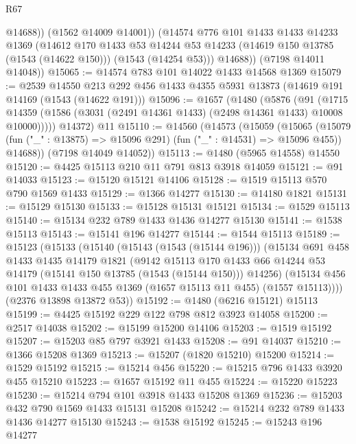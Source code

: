 \begin{lexlean}{R67}
\begin{coremodule}
              @14688))
          (@1562 @14009 @14001))
        (@14574
          @776
          @101
          @1433
          @1433
          @14233
          @1369
          (@14612
            @170
            @1433
            @53
            @14244
            @53
            @14233
            (@14619 @150 @13785 (@1543 (@14622 @150)))
            (@1543 (@14254 @53)))
          @14688))
      (@7198 @14011 @14048))
@15065 := @14574 @783 @101 @14022 @1433 @14568 @1369
@15079 := @2539
    @14550
    @213
    @292
    @456
    @1433
    @4355
    @5931
    @13873
    (@14619 @191 @14169 (@1543 (@14622 @191)))
@15096 := @1657
    (@1480
      (@5876
        (@91
          (@1715 @14359 (@1586 (@3031 (@2491 @14361 @1433) (@2498 @14361 @1433) @10008 @10000)))))
      @14372)
    @11
@15110 := @14560
    (@14573
      (@15059
        (@15065
          (@15079 (fun ("_" : @13875) => @15096 @291) (fun ("_" : @14531) => @15096 @455))
          @14688))
      (@7198 @14049 @14052))
@15113 := @1480 (@5965 @14558) @14550
@15120 := @4425 @15113 @210 @11 @791 @813 @3918 @14059
@15121 := @91 @14033
@15123 := @15120 @15121 @14106
@15128 := @1519 @15113 @570 @790 @1569 @1433
@15129 := @1366 @14277
@15130 := @14180 @1821
@15131 := @15129 @15130
@15133 := @15128 @15131 @15121
@15134 := @1529 @15113
@15140 := @15134 @232 @789 @1433 @1436 @14277 @15130
@15141 := @1538 @15113
@15143 := @15141 @196 @14277
@15144 := @1544 @15113
@15189 := @15123
    (@15133
      (@15140
        (@15143 (@1543 (@15144 @196)))
        (@15134
          @691
          @458
          @1433
          @1435
          @14179
          @1821
          (@9142
            @15113
            @170
            @1433
            @66
            @14244
            @53
            @14179
            (@15141 @150 @13785 (@1543 (@15144 @150)))
            @14256)
          (@15134 @456 @101 @1433 @1433 @455 @1369 (@1657 @15113 @11 @455) (@1557 @15113))))
      (@2376 @13898 @13872 @53))
@15192 := @1480 (@6216 @15121) @15113
@15199 := @4425 @15192 @229 @122 @798 @812 @3923 @14058
@15200 := @2517 @14038
@15202 := @15199 @15200 @14106
@15203 := @1519 @15192
@15207 := @15203 @85 @797 @3921 @1433
@15208 := @91 @14037
@15210 := @1366 @15208 @1369
@15213 := @15207 (@1820 @15210) @15200
@15214 := @1529 @15192
@15215 := @15214 @456
@15220 := @15215 @796 @1433 @3920 @455 @15210
@15223 := @1657 @15192 @11 @455
@15224 := @15220 @15223
@15230 := @15214 @794 @101 @3918 @1433 @15208 @1369
@15236 := @15203 @432 @790 @1569 @1433 @15131 @15208
@15242 := @15214 @232 @789 @1433 @1436 @14277 @15130
@15243 := @1538 @15192
@15245 := @15243 @196 @14277

\end{coremodule}
\end{lexlean}
